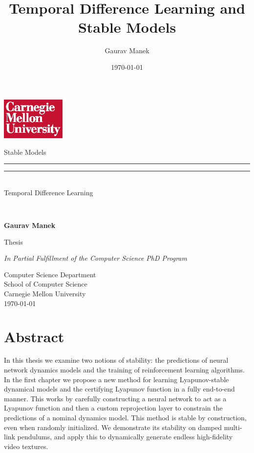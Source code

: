 \documentclass[11pt]{book}
\title{ Temporal Difference Learning and Stable Models }
\author{ Gaurav Manek }
\date{\today}
\begin{document}
\frontmatter

\begin{titlepage}
  {
    \hfill\includegraphics[width=1.25in,trim=0 0 .125in .25in]{cmu/cmu-wordmark-square-w-on-r}
  }
  \begin{center}{\SourceSerifPro
    \vfill

    {\Huge\OpenSans
    {
    {Stable Models}\\[-1.em]
    \rule{0.25\textwidth}{1pt}
    \rule{0.25\textwidth}{1pt}\\[.5em]
    {Temporal Difference Learning}
    }
    }\\


    \vspace{0.25in}

    \textbf{\large Gaurav Manek}\\

    \vfill

    Thesis

    \textit{In Partial Fulfillment of the Computer Science PhD Program}

    \vspace{0.33in}
    Computer Science Department\\
    School of Computer Science\\
    Carnegie Mellon University\\
    \today

    }\end{center}
\end{titlepage}

\cleardoublepage

\chapter{Abstract}
In this thesis we examine two notions of stability: the predictions of neural network dynamics models and the training of reinforcement learning algorithms.
In the first chapter we propose a new method for learning Lyapunov-stable dynamical models and the certifying Lyapunov function in a fully end-to-end manner. This works by carefully constructing a neural network to act as a Lyapunov function and then a custom reprojection layer to constrain the predictions of a nominal dynamics model. This method is stable by construction, even when randomly initialized. We demonstrate its stability on damped multi-link pendulums, and apply this to dynamically generate endless high-fidelity video textures.
\end{document}
